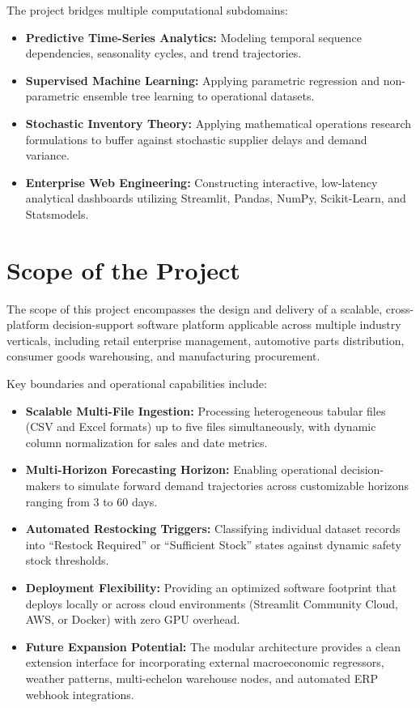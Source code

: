 \documentclass[12pt,a4paper]{report}
\begin{document}
The project bridges multiple computational subdomains:
\begin{itemize}
    \item \textbf{Predictive Time-Series Analytics:} Modeling temporal sequence dependencies, seasonality cycles, and trend trajectories.
    \item \textbf{Supervised Machine Learning:} Applying parametric regression and non-parametric ensemble tree learning to operational datasets.
    \item \textbf{Stochastic Inventory Theory:} Applying mathematical operations research formulations to buffer against stochastic supplier delays and demand variance.
    \item \textbf{Enterprise Web Engineering:} Constructing interactive, low-latency analytical dashboards utilizing Streamlit, Pandas, NumPy, Scikit-Learn, and Statsmodels.
\end{itemize}

\section{Scope of the Project}
The scope of this project encompasses the design and delivery of a scalable, cross-platform decision-support software platform applicable across multiple industry verticals, including retail enterprise management, automotive parts distribution, consumer goods warehousing, and manufacturing procurement.

Key boundaries and operational capabilities include:
\begin{itemize}
    \item \textbf{Scalable Multi-File Ingestion:} Processing heterogeneous tabular files (CSV and Excel formats) up to five files simultaneously, with dynamic column normalization for sales and date metrics.
    \item \textbf{Multi-Horizon Forecasting Horizon:} Enabling operational decision-makers to simulate forward demand trajectories across customizable horizons ranging from 3 to 60 days.
    \item \textbf{Automated Restocking Triggers:} Classifying individual dataset records into ``Restock Required'' or ``Sufficient Stock'' states against dynamic safety stock thresholds.
    \item \textbf{Deployment Flexibility:} Providing an optimized software footprint that deploys locally or across cloud environments (Streamlit Community Cloud, AWS, or Docker) with zero GPU overhead.
    \item \textbf{Future Expansion Potential:} The modular architecture provides a clean extension interface for incorporating external macroeconomic regressors, weather patterns, multi-echelon warehouse nodes, and automated ERP webhook integrations.
\end{itemize}
\end{document}
